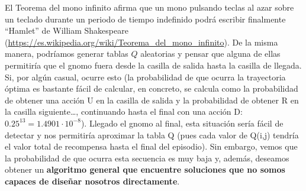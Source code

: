 \documentclass{article}
\begin{document}





El Teorema del mono infinito afirma que un mono pulsando teclas al azar sobre un teclado durante un periodo de tiempo indefinido podrá escribir finalmente ``Hamlet'' de William Shakespeare (\url{https://es.wikipedia.org/wiki/Teorema_del_mono_infinito}). De la misma manera, podríamos generar tablas $Q$ aleatorias y pensar que alguna de ellas permitiría que el gnomo fuera desde la casilla de salida hasta la casilla de llegada. Si, por algún casual, ocurre esto (la probabilidad de que ocurra la trayectoria óptima es bastante fácil de calcular, en concreto, se calcula como la probabilidad de obtener una acción U en la casilla de salida y la probabilidad de obtener R en la casilla siguiente\ldots, continuando hasta el final con una acción D: $0.25^{13}=1.4901·10^{-8}$). Llegado el gnomo al final, esta situación  sería fácil de detectar y nos permitiría aproximar la tabla Q (pues cada valor de Q(i,j) tendría el valor total de recompensa hasta el final del episodio). Sin embargo, vemos que la probabilidad de que ocurra esta secuencia es muy baja y, además, deseamos obtener un \textbf{algoritmo general que encuentre soluciones que no somos capaces de diseñar nosotros directamente}. %

\end{document}
